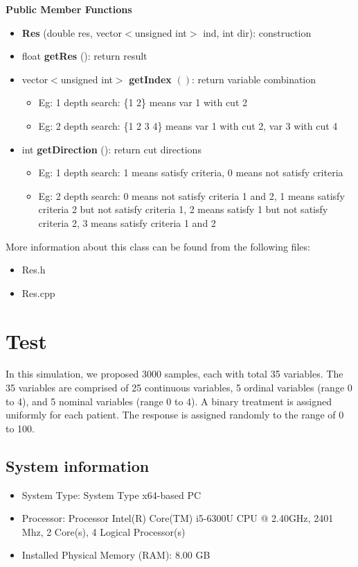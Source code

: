 \documentclass{article}
\begin{document}
\textbf{Public Member Functions}
\begin{itemize}
\item \textbf{Res} (double res, vector$<$unsigned int$>$ ind, int dir): construction
\item float \textbf{getRes} (): return result
\item vector$<$unsigned int$>$ \textbf{getIndex} $\left(\right)$: return variable combination
\begin{itemize}
\item Eg: 1 depth search: \{1 2\} means var 1 with cut 2
\item Eg: 2 depth search: \{1 2 3 4\} means var 1 with cut 2, var 3 with cut 4
\end{itemize}

\item int \textbf{getDirection} (): return cut directions
\begin{itemize}
\item Eg: 1 depth search: 1 means satisfy criteria, 0 means not satisfy criteria
\item Eg: 2 depth search: 0 means not satisfy criteria 1 and 2, 1 means satisfy criteria 2 but not satisfy criteria 1, 2 means satisfy 1 but not satisfy criteria 2, 3 means satisfy criteria 1 and 2 
\end{itemize}

\end{itemize}

More information about this class can be found from the following files:
\begin{itemize}
\item Res.h 
\item Res.cpp
\end{itemize}



\pagebreak
\section{Test}
In this simulation, we proposed 3000 samples, each with total 35 variables. The 35 variables are comprised of 25 continuous variables, 5 ordinal variables (range 0 to 4), and 5 nominal variables (range 0 to 4). A binary treatment is assigned uniformly for each patient. The response is assigned randomly to the range of 0 to 100. 


\subsection{System information}
\begin{itemize}
\item System Type:
System Type	x64-based PC
\item Processor: 
Processor	Intel(R) Core(TM) i5-6300U CPU @ 2.40GHz, 2401 Mhz, 2 Core(s), 4 Logical Processor(s)
\item Installed Physical Memory (RAM):	8.00 GB
\end{itemize}
\end{document}
